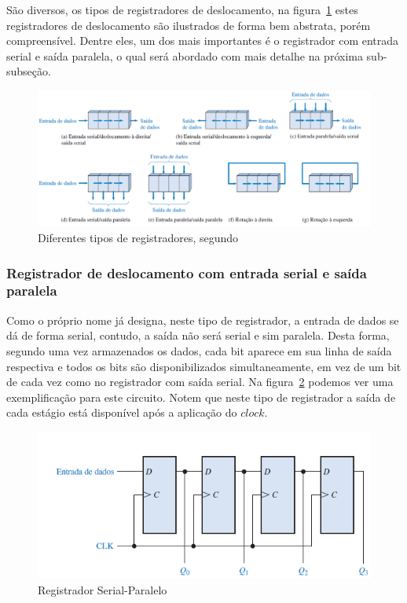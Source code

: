 \documentclass[12pt]{article}
\begin{document}
São diversos, os tipos de registradores de deslocamento, na figura~\ref{fig:registradores} estes registradores de deslocamento são ilustrados de forma bem abstrata, porém compreensível. Dentre eles, um dos mais importantes é o registrador com entrada serial e saída paralela, o qual será abordado com mais detalhe na próxima sub-subseção.

\begin{figure}[h]
\centering
\includegraphics[width=.8\textwidth]{img/Fig6tipodeRegistrador.png}
\caption{Diferentes tipos de registradores, segundo \cite{floyd2011digital}}
\label{fig:registradores}
\end{figure}

\subsubsection{Registrador de deslocamento com entrada serial e saída paralela}
Como o próprio nome já designa, neste tipo de registrador, a entrada de dados se dá de forma serial, contudo, a saída não será serial e sim paralela. Desta forma, segundo \cite{floyd2011digital} uma vez armazenados os dados, cada bit aparece em sua linha de saída respectiva e todos os bits são disponibilizados simultaneamente, em vez de um bit de cada vez como no registrador com saída serial. Na figura~\ref{fig:registradorsp} podemos ver uma exemplificação para este circuito. Notem que neste tipo de registrador a saída de cada estágio está disponível após a aplicação do $clock$.


\begin{figure}[h]
\centering
\includegraphics[width=.5\textwidth]{img/Fig7RegistradorSerialParalelo.png}
\caption{Registrador Serial-Paralelo\cite{floyd2011digital}}
\label{fig:registradorsp}
\end{figure}
\end{document}
